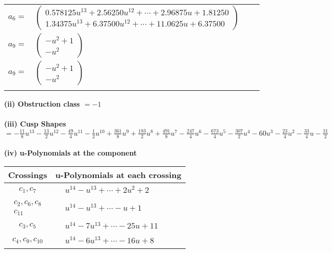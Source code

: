 \documentclass[1p]{elsarticle_modified}
\theoremstyle{definition}
\begin{document}
\begin{tabular}{m{7pt} m{180pt} m{7pt} m{180pt} }
\flushright $a_{6}=$&$\begin{pmatrix}0.578125 u^{13}+2.56250 u^{12}+\cdots+2.96875 u+1.81250\\1.34375 u^{13}+6.37500 u^{12}+\cdots+11.0625 u+6.37500\end{pmatrix}$ \\
\flushright $a_{9}=$&$\begin{pmatrix}- u^2+1\\- u^2\end{pmatrix}$\\ \flushright $a_{9}=$&$\begin{pmatrix}- u^2+1\\- u^2\end{pmatrix}$\\&\end{tabular}
\flushleft \textbf{(ii) Obstruction class $= -1$}\\~\\
\flushleft \textbf{(iii) Cusp Shapes $= -\frac{11}{8} u^{13}-\frac{13}{2} u^{12}-\frac{49}{4} u^{11}-\frac{1}{2} u^{10}+\frac{361}{8} u^9+\frac{183}{2} u^8+\frac{491}{8} u^7-\frac{247}{4} u^6-\frac{673}{4} u^5-\frac{307}{2} u^4-60 u^3-\frac{23}{4} u^2-\frac{33}{4} u-\frac{31}{2}$}\\~\\
\newpage\renewcommand{\arraystretch}{1}
\flushleft \textbf{(iv) u-Polynomials at the component}\newline \\
\begin{tabular}{m{50pt}|m{274pt}}
Crossings & \hspace{64pt}u-Polynomials at each crossing \\
\hline $$\begin{aligned}c_{1},c_{7}\end{aligned}$$&$\begin{aligned}
&u^{14}- u^{13}+\cdots+2 u^2+2
\end{aligned}$\\
\hline $$\begin{aligned}c_{2},c_{6},c_{8}\\c_{11}\end{aligned}$$&$\begin{aligned}
&u^{14}- u^{13}+\cdots- u+1
\end{aligned}$\\
\hline $$\begin{aligned}c_{3},c_{5}\end{aligned}$$&$\begin{aligned}
&u^{14}-7 u^{13}+\cdots-25 u+11
\end{aligned}$\\
\hline $$\begin{aligned}c_{4},c_{9},c_{10}\end{aligned}$$&$\begin{aligned}
&u^{14}-6 u^{13}+\cdots-16 u+8
\end{aligned}$\\
\hline
\end{tabular}\\~\\
\end{document}
